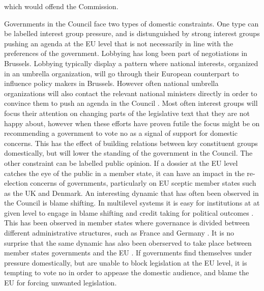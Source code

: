 which would offend the Commission. 

Governments in the Council face two types of domestic constraints. One type can be labelled interest group pressure, and is distunguished by strong interest groups pushing an agenda at the EU level that is not necessarily in line with the preferences of the government. Lobbying has long been part of negotiations in Brussels. Lobbying typically display a pattern where national interests, organized in an umbrella organization, will go through their European counterpart to influence policy makers in Brussels. However often national umbrella organizations will also contact the relevant national ministers directly in order to convince them to push an agenda in the Council \citep{Beyers2002}. Most often interest groups will focus their attention on changing parts of the legislative text that they are not happy about, however when these efforts have proven futile the focus might be on recommending a government to vote no as a signal of support for domestic concerns. This has the effect of building relations between key constituent groups domestically, but will lower the standing of the government in the Council. The other constraint can be labelled public opinion. If a dossier at the EU level catches the eye of the public in a member state, it can have an impact in the re-election concerns of governments, particularly on EU sceptic member states such as the UK and Denmark. An interesting dynamic that has often been observed in the Council is blame shifting. In multilevel systems it is easy for institutions at at given level to engage in blame shifting and credit taking for political outcomes \citep{Anderson2006}. This has been observed in member states where governance is divided between different administrative structures, such as France and Germany \citep{Elgie2006}. It is no surprise that the same dynamic has also been oberserved to take place between member states governments and the EU \citep{Franchino2004}. If governments find themselves under pressure domestically, but are unable to block legislation at the EU level, it is tempting to vote no in order to appease the domestic audience, and blame the EU for forcing unwanted legislation. 

